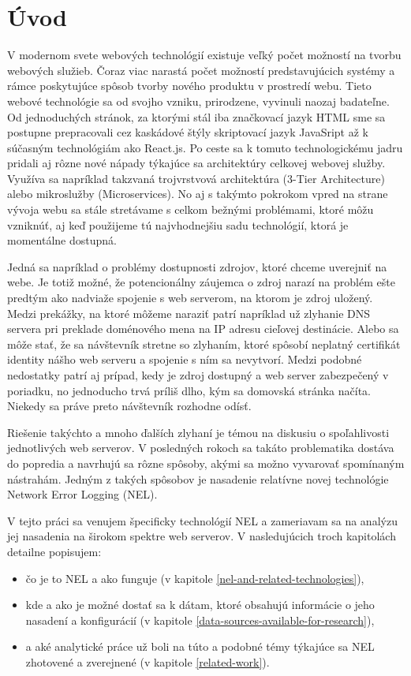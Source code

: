\chapter{Úvod}
\label{uvod}
\vspace{1cm}

V modernom svete webových technológií existuje veľký počet možností na tvorbu webových služieb. Čoraz viac narastá počet možností predstavujúcich systémy a rámce poskytujúce spôsob tvorby nového produktu v prostredí webu.
Tieto webové technológie sa od svojho vzniku, prirodzene, vyvinuli naozaj badateľne. 
Od jednoduchých stránok, za ktorými stál iba značkovací jazyk 
HTML sme sa postupne prepracovali cez kaskádové štýly skriptovací jazyk 
JavaSript až k súčasným technológiám ako React.js. 
Po ceste sa k tomuto technologickému jadru pridali aj rôzne 
nové nápady týkajúce sa architektúry celkovej webovej služby. 
Využíva sa napríklad takzvaná trojvrstvová architektúra (3-Tier Architecture) alebo mikroslužby (Microservices). 
No aj s takýmto pokrokom vpred na strane vývoja webu sa stále stretávame s celkom bežnými problémami, ktoré môžu vzniknúť, aj 
keď použijeme tú najvhodnejšiu sadu technológií, ktorá je momentálne dostupná.

Jedná sa napríklad o problémy dostupnosti zdrojov, ktoré chceme uverejniť na webe. 
Je totiž možné, že potencionálny záujemca o zdroj narazí na problém ešte predtým ako nadviaže spojenie s web serverom, na ktorom je zdroj uložený.
Medzi prekážky, na ktoré môžeme naraziť patrí napríklad už zlyhanie DNS servera pri preklade doménového mena na IP adresu cieľovej destinácie. 
Alebo sa môže stať, že sa návštevník stretne so zlyhaním, ktoré spôsobí neplatný certifikát identity nášho web serveru a spojenie s ním sa nevytvorí. 
Medzi podobné nedostatky patrí aj prípad, kedy je zdroj dostupný a web server zabezpečený v poriadku, no jednoducho trvá príliš dlho, kým sa domovská stránka načíta. Niekedy sa práve preto návštevník rozhodne odísť.

Riešenie takýchto a mnoho ďalších zlyhaní je témou na diskusiu o spoľahlivosti jednotlivých web serverov. 
V posledných rokoch sa takáto problematika dostáva do popredia a navrhujú sa rôzne 
spôsoby, akými sa možno vyvarovať spomínaným nástrahám. Jedným z takých spôsobov je nasadenie relatívne novej 
technológie Network Error Logging (NEL).

\pagebreak

V tejto práci sa venujem špecificky technológií NEL a zameriavam sa na analýzu jej nasadenia na širokom spektre web serverov. 
V nasledujúcich troch kapitolách detailne popisujem:
\begin{itemize}
    \item čo je to NEL a ako funguje (v kapitole \ref{nel-and-related-technologies}),
    \item kde a ako je možné dostať sa k dátam, ktoré obsahujú informácie o jeho nasadení a 
konfigurácií (v kapitole \ref{data-sources-available-for-research}),
    \item a aké analytické práce už boli na túto a podobné témy
týkajúce sa NEL zhotovené a zverejnené (v kapitole \ref{related-work}).
\end{itemize}

